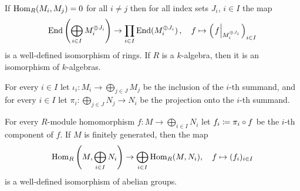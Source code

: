\begin{corollary}
  \label{corollary: decomposition of endomorphism ring into product including sums}
  If $\operatorname{Hom}_R(M_i, M_j) = 0$ for all $i \neq j$ then for all index sets $J_i$, $i \in I$ the map
  \[
            \End\left( \bigoplus_{i \in I} M_i^{\oplus J_i} \right)
    \to     \prod_{i \in I} \End( M_i^{\oplus J_i} ) \,,
    \quad   f
    \mapsto \left( \restrict*{f}{M_i^{\oplus J_i}} \right)_{i \in I}
  \]
  is a well-defined isomorphism of rings.
  If $R$ is a $k$-algebra, then it is an isomorphism of $k$-algebras.
\end{corollary}


\begin{fluff}
  For every $i \in I$ let $\iota_i \colon M_i \to \bigoplus_{j \in J} M_j$ be the inclusion of the $i$-th summand, and for every $i \in I$ let $\pi_i \colon \bigoplus_{j \in J} N_j \to N_i$ be the projection onto the $i$-th summand.
\end{fluff}


\begin{lemma}
  \label{lemma: hom is additive for fg modules}
  For every $R$-module homomorphism $f \colon M \to \bigoplus_{i \in I} N_i$ let $f_i \coloneqq \pi_i \circ f$ be the $i$-th component of $f$.
  If $M$ is finitely generated, then the map
  \[
            \operatorname{Hom}_R\left( M, \bigoplus_{i \in I} N_i \right)
    \to     \bigoplus_{i \in I} \operatorname{Hom}_R(M, N_i),
    \quad   f
    \mapsto (f_i)_{i \in I}
  \]
  is a well-defined isomorphism of abelian groups.
\end{lemma}


